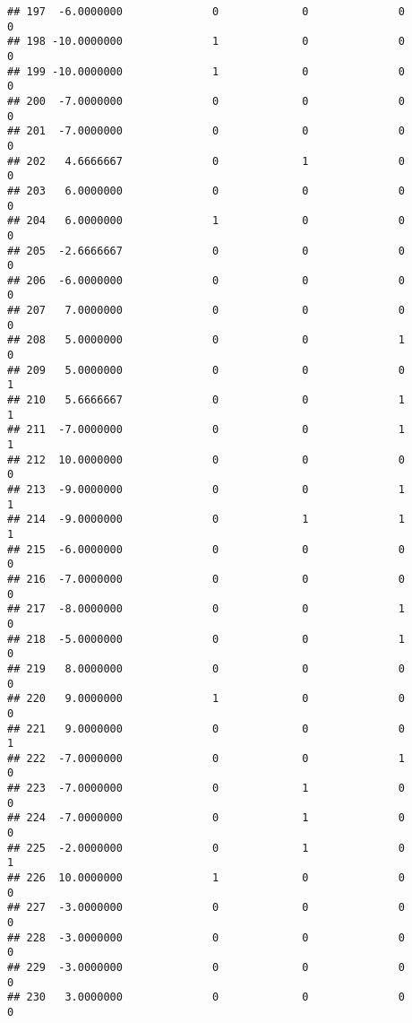 \documentclass[
]{article}
\begin{document}
\begin{verbatim}
## 197  -6.0000000              0             0              0             0
## 198 -10.0000000              1             0              0             0
## 199 -10.0000000              1             0              0             0
## 200  -7.0000000              0             0              0             0
## 201  -7.0000000              0             0              0             0
## 202   4.6666667              0             1              0             0
## 203   6.0000000              0             0              0             0
## 204   6.0000000              1             0              0             0
## 205  -2.6666667              0             0              0             0
## 206  -6.0000000              0             0              0             0
## 207   7.0000000              0             0              0             0
## 208   5.0000000              0             0              1             0
## 209   5.0000000              0             0              0             1
## 210   5.6666667              0             0              1             1
## 211  -7.0000000              0             0              1             1
## 212  10.0000000              0             0              0             0
## 213  -9.0000000              0             0              1             1
## 214  -9.0000000              0             1              1             1
## 215  -6.0000000              0             0              0             0
## 216  -7.0000000              0             0              0             0
## 217  -8.0000000              0             0              1             0
## 218  -5.0000000              0             0              1             0
## 219   8.0000000              0             0              0             0
## 220   9.0000000              1             0              0             0
## 221   9.0000000              0             0              0             1
## 222  -7.0000000              0             0              1             0
## 223  -7.0000000              0             1              0             0
## 224  -7.0000000              0             1              0             0
## 225  -2.0000000              0             1              0             1
## 226  10.0000000              1             0              0             0
## 227  -3.0000000              0             0              0             0
## 228  -3.0000000              0             0              0             0
## 229  -3.0000000              0             0              0             0
## 230   3.0000000              0             0              0             0

\end{verbatim}
\end{document}
